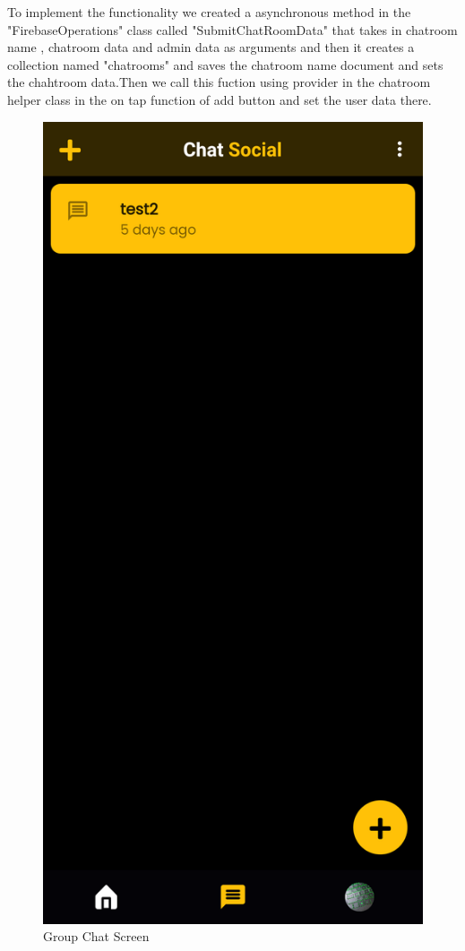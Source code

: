 To implement the functionality we created a asynchronous method in the "FirebaseOperations" class called "SubmitChatRoomData" that takes in chatroom name , chatroom data and admin data as arguments and then it creates a collection named "chatrooms" and saves the chatroom name document and sets the chahtroom data.Then we call this fuction using provider in the chatroom helper class in the on tap function of add button and set the user data there.

\begin{figure}[H]
    \centering
    \includegraphics[scale=0.15]{App Screenshots/Group Chat screen.png}
    \caption{Group Chat Screen}
    \label{fig:Group Chat Screen}
\end{figure}


